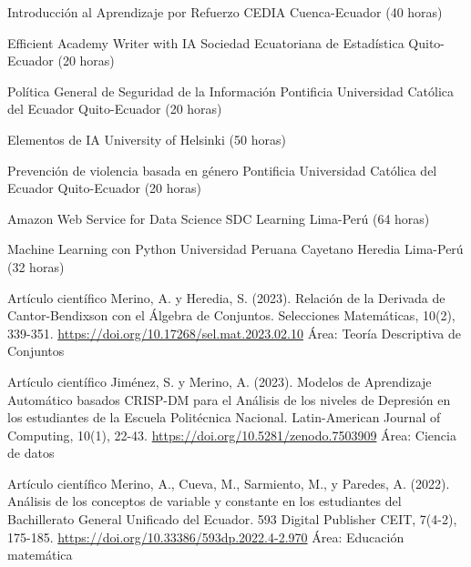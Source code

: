 \documentclass[
	a4paper,
	maincolor=cvblue!70!blue,
	sidecolor=gray!30,
	sectioncolor=cvblue!70!blue,
    sidebarwidth=7.5cm,
	topbottommargin=20pt,
	leftrightmargin=20pt,
]{fortysecondscv}
\begin{document}
    {Introducción al Aprendizaje por Refuerzo}
    {CEDIA}
    {Cuenca-Ecuador (40 horas)}

    {Efficient Academy Writer with IA}
    {Sociedad Ecuatoriana de Estadística}
    {Quito-Ecuador (20 horas)}

    {Política General de Seguridad de la Información}
    {Pontificia Universidad Católica del Ecuador}
    {Quito-Ecuador (20 horas)}

    {Elementos de IA}
    {University of Helsinki}
    {(50 horas)}

    {Prevención de violencia basada en género}
    {Pontificia Universidad Católica del Ecuador}
    {Quito-Ecuador (20 horas)}

    {Amazon Web Service for Data Science}
    {SDC Learning}
    {Lima-Perú (64 horas)}

    {Machine Learning con Python}
    {Universidad Peruana Cayetano Heredia}
    {Lima-Perú (32 horas)}




    {Artículo científico}
    {Merino, A. y Heredia, S. (2023). Relación de la Derivada de Cantor-Bendixson con el Álgebra de Conjuntos. Selecciones Matemáticas, 10(2), 339-351.}
    {\url{https://doi.org/10.17268/sel.mat.2023.02.10}}
    {Área: Teoría Descriptiva de Conjuntos}
    
    {Artículo científico}
    {Jiménez, S. y Merino, A. (2023). Modelos de Aprendizaje Automático basados CRISP-DM para el Análisis de los niveles de Depresión en los estudiantes de la Escuela Politécnica Nacional. Latin-American Journal of Computing, 10(1), 22-43.}     
    {\url{https://doi.org/10.5281/zenodo.7503909}}
    {Área: Ciencia de datos}
    
    {Artículo científico}
    {Merino, A., Cueva, M., Sarmiento, M., y Paredes, A. (2022). Análisis de los conceptos de variable y constante en los estudiantes del Bachillerato General Unificado del Ecuador. 593 Digital Publisher CEIT, 7(4-2), 175-185.}     
    {\url{https://doi.org/10.33386/593dp.2022.4-2.970}}
    {Área: Educación matemática}
    
\end{document}
